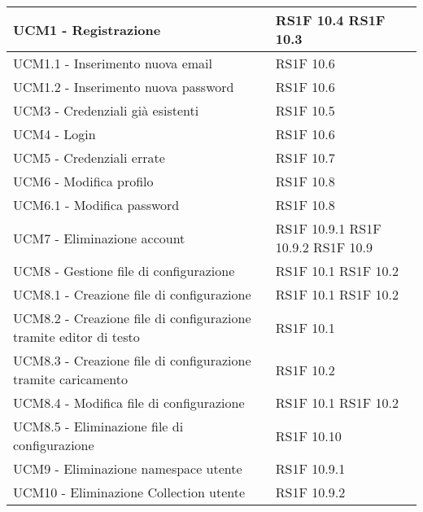 \begin{center}
\begin{longtable}{ | p{5cm} | p{5cm} |}
            UCM1 - Registrazione &  RS1F 10.4 \newline  RS1F 10.3 \newline  \\ \hline      
            UCM1.1 - Inserimento nuova email &  RS1F 10.6 \newline  \\ \hline      
            UCM1.2 - Inserimento nuova password &  RS1F 10.6 \newline  \\ \hline      
            UCM3 - Credenziali già esistenti &  RS1F 10.5 \newline  \\ \hline      
            UCM4 - Login &  RS1F 10.6 \newline  \\ \hline      
            UCM5 - Credenziali errate &  RS1F 10.7 \newline  \\ \hline      
            UCM6 - Modifica profilo &  RS1F 10.8 \newline  \\ \hline      
            UCM6.1 - Modifica password &  RS1F 10.8 \newline  \\ \hline      
            UCM7 - Eliminazione account &  RS1F 10.9.1 \newline  RS1F 10.9.2 \newline  RS1F 10.9 \newline  \\ \hline      
            UCM8 - Gestione file di configurazione &  RS1F 10.1 \newline  RS1F 10.2 \newline  \\ \hline      
            UCM8.1 - Creazione file di configurazione &  RS1F 10.1 \newline  RS1F 10.2 \newline  \\ \hline      
            UCM8.2 - Creazione file di configurazione tramite editor di testo &  RS1F 10.1 \newline  \\ \hline      
            UCM8.3 - Creazione file di configurazione tramite caricamento &  RS1F 10.2 \newline  \\ \hline      
            UCM8.4 - Modifica file di configurazione &  RS1F 10.1 \newline  RS1F 10.2 \newline  \\ \hline      
            UCM8.5 - Eliminazione file di configurazione &  RS1F 10.10 \newline  \\ \hline      
            UCM9 - Eliminazione namespace utente &  RS1F 10.9.1 \newline  \\ \hline      
            UCM10 - Eliminazione Collection utente &  RS1F 10.9.2 \newline  \\ \hline     
      \end{longtable}
      \egroup
      \end{center}  
\clearpage

